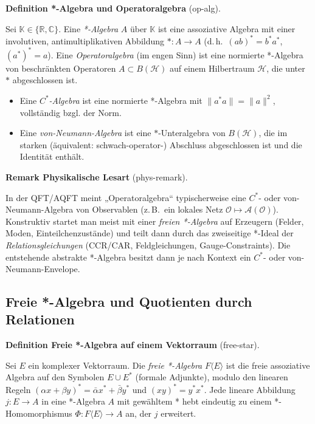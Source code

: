 \documentclass[10pt, letterpaper]{article}
\newcommand{\CustomHeading}[3]{%
  \par\medskip\noindent%
  \textbf{#1 #2} \textnormal{(#3)}.\enskip%
}
\newenvironment{DEF}[2]{\begin{unitbox}\CustomHeading{Definition}{#1}{#2}}{\end{unitbox}}
\newenvironment{REM}[2]{\begin{unitbox}\CustomHeading{Remark}{#1}{#2}}{\end{unitbox}}
\begin{document}
\begin{DEF}{*-Algebra und Operatoralgebra}{op-alg}
Sei $\mathbb{K}\in\{\mathbb{R},\mathbb{C}\}$. 
Eine \emph{*-Algebra} $A$ über $\mathbb{K}$ ist eine assoziative Algebra mit einer
involutiven, antimultiplikativen Abbildung $*:A\to A$ (d.\,h.\ $(ab)^*=b^*a^*$, $(a^*)^*=a$).
Eine \emph{Operatoralgebra} (im engen Sinn) ist eine normierte *-Algebra von beschränkten Operatoren
$A\subset B(\mathcal{H})$ auf einem Hilbertraum $\mathcal{H}$, die unter $*$ abgeschlossen ist.
\begin{itemize}[leftmargin=*,nosep]
\item Eine \emph{$C^*$-Algebra} ist eine normierte *-Algebra mit $\|a^*a\|=\|a\|^2$, vollständig bzgl. der Norm.
\item Eine \emph{von-Neumann-Algebra} ist eine $*$-Unteralgebra von $B(\mathcal{H})$, die im starken (äquivalent: schwach-operator-) Abschluss abgeschlossen ist und die Identität enthält.
\end{itemize}
\end{DEF}

\begin{REM}{Physikalische Lesart}{phys-remark}
In der QFT/AQFT meint „Operatoralgebra“ typischerweise eine $C^*$- oder von-Neumann-Algebra von Observablen
(z.\,B.\ ein lokales Netz $\mathcal{O}\mapsto \mathcal{A}(\mathcal{O})$).
Konstruktiv startet man meist mit einer \emph{freien *-Algebra} auf Erzeugern (Felder, Moden, Einteilchenzustände)
und teilt dann durch das zweiseitige *-Ideal der \emph{Relationsgleichungen} (CCR/CAR, Feldgleichungen, Gauge-Constraints).
Die entstehende abstrakte *-Algebra besitzt dann je nach Kontext ein $C^*$- oder von-Neumann-Envelope.
\end{REM}

\subsection{Freie *-Algebra und Quotienten durch Relationen}

\begin{DEF}{Freie *-Algebra auf einem Vektorraum}{free-star}
Sei $E$ ein komplexer Vektorraum. Die \emph{freie *-Algebra} $F\langle E\rangle$ ist die freie assoziative Algebra
auf den Symbolen $E\cup E^\ast$ (formale Adjunkte), modulo den linearen Regeln
$(\alpha x+\beta y)^\ast=\bar\alpha x^\ast+\bar\beta y^\ast$ und $(xy)^\ast=y^\ast x^\ast$.
Jede lineare Abbildung $j:E\to A$ in eine *-Algebra $A$ mit gewähltem * hebt eindeutig zu einem *-Homomorphismus
$\Phi:F\langle E\rangle\to A$ an, der $j$ erweitert.
\end{DEF}
\end{document}

